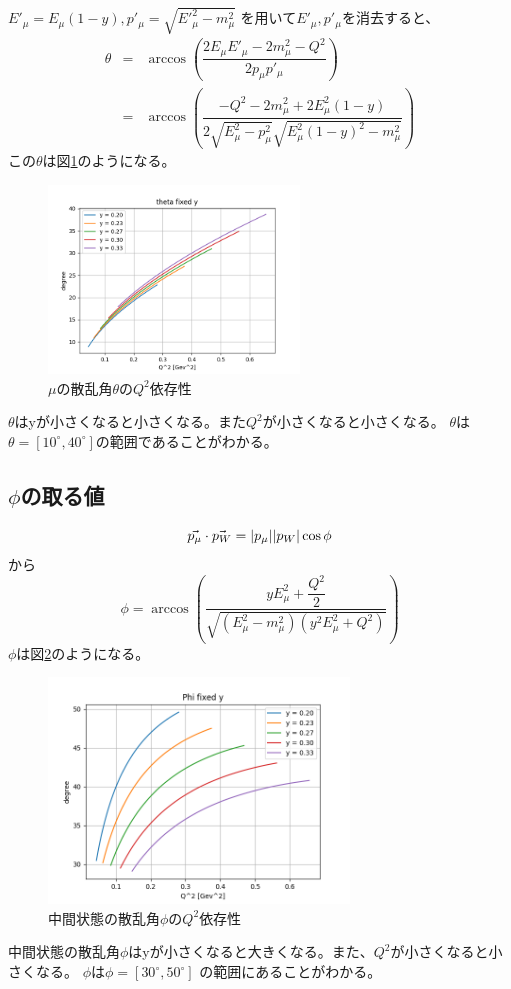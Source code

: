 $E'_\mu = E_\mu(1-y), p'_\mu = \sqrt{E'^2_\mu - m^2_\mu}$
を用いて$E'_\mu, p'_\mu$を消去すると、
\begin{eqnarray}
    \theta & = &\arccos \left( \dfrac {2E_\mu E'_\mu -2m^2_\mu-Q^2}{2p_\mu p'_\mu} \right) \\
    & = & \arccos \left(\dfrac{-Q^2-2m^2_\mu+2E^2_\mu(1-y)}{2\sqrt{E^2_\mu-p^2_\mu}\sqrt{E^2_\mu(1-y)^2-m^2_\mu} }  \right)
\end{eqnarray}
この$\theta$は図\ref{fig:angle3}のようになる。
\begin{figure}[H]
    \centering
    \includegraphics[height=5cm]{img/theta_degree_y_fixed.png}
    \caption{$\mu$の散乱角$\theta$の$Q^2$依存性}
    \label{fig:angle3}
\end{figure}
$\theta$はyが小さくなると小さくなる。また$Q^2$が小さくなると小さくなる。
$\theta$は$\theta=[10^\circ,40^\circ]$の範囲であることがわかる。

\subsection{$\phi$の取る値}
\begin{equation}
    \vec{p_\mu} \cdot \vec{p_W} = |p_\mu| |p_W| \\ \cos\phi
\end{equation}
から
\begin{equation}
    \phi = \arccos \left( \dfrac{yE^2_\mu + \dfrac{Q^2}{2}} {\sqrt{(E^2_\mu - m^2_\mu)(y^2E^2_\mu+Q^2)}} \right)
\end{equation}
$\phi$は図\ref{fig:angle4}のようになる。
\begin{figure}[H]
    \centering
    \includegraphics[width=8cm]{img/Phi_degree_fixed_y.png}
    \caption{中間状態の散乱角$\phi$の$Q^2$依存性}
    \label{fig:angle4}
\end{figure}
中間状態の散乱角$\phi$はyが小さくなると大きくなる。また、$Q^2$が小さくなると小さくなる。
$\phi$は$\phi = [30^\circ, 50^\circ]$ の範囲にあることがわかる。

